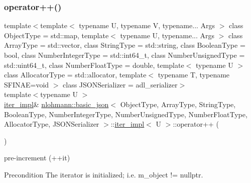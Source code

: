 \subsubsection{\texorpdfstring{operator++()}{operator++()}\hspace{0.1cm}{\footnotesize\ttfamily [2/2]}}
{\footnotesize\ttfamily template$<$template$<$ typename U, typename V, typename... Args $>$ class Object\+Type = std\+::map, template$<$ typename U, typename... Args $>$ class Array\+Type = std\+::vector, class String\+Type  = std\+::string, class Boolean\+Type  = bool, class Number\+Integer\+Type  = std\+::int64\+\_\+t, class Number\+Unsigned\+Type  = std\+::uint64\+\_\+t, class Number\+Float\+Type  = double, template$<$ typename U $>$ class Allocator\+Type = std\+::allocator, template$<$ typename T, typename S\+F\+I\+N\+A\+E=void $>$ class J\+S\+O\+N\+Serializer = adl\+\_\+serializer$>$ \\
template$<$typename U $>$ \\
\mbox{\hyperlink{classnlohmann_1_1basic__json_1_1iter__impl}{iter\+\_\+impl}}\& \mbox{\hyperlink{classnlohmann_1_1basic__json}{nlohmann\+::basic\+\_\+json}}$<$ Object\+Type, Array\+Type, String\+Type, Boolean\+Type, Number\+Integer\+Type, Number\+Unsigned\+Type, Number\+Float\+Type, Allocator\+Type, J\+S\+O\+N\+Serializer $>$\+::\mbox{\hyperlink{classnlohmann_1_1basic__json_1_1iter__impl}{iter\+\_\+impl}}$<$ U $>$\+::operator++ (\begin{DoxyParamCaption}{ }\end{DoxyParamCaption})\hspace{0.3cm}{\ttfamily [inline]}}



pre-\/increment (++it) 

\begin{DoxyPrecond}{Precondition}
The iterator is initialized; i.\+e. {\ttfamily m\+\_\+object != nullptr}. 
\end{DoxyPrecond}
\mbox{\label{classnlohmann_1_1basic__json_1_1iter__impl_a170970e99b7a6d124da0fffa4cb76dba}} 
